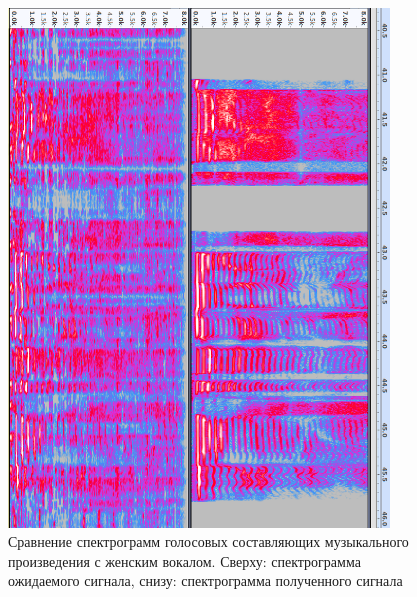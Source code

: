 \begin{figure}
	\centering
	\includegraphics[width=0.9\textwidth]{inc/img/spec-voice-female}
	\caption{Сравнение спектрограмм голосовых составляющих музыкального произведения с женским вокалом. Сверху: спектрограмма ожидаемого сигнала, снизу: спектрограмма полученного сигнала}
	\label{res:femalevoice}
\end{figure}

